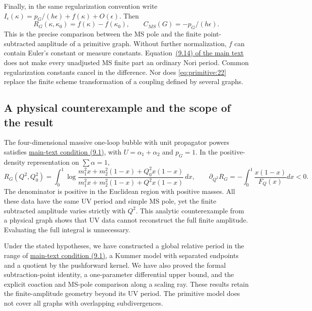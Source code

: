 \documentclass[11pt,a4paper,oneside]{article}
\theoremstyle{plain}
\theoremstyle{definition}
\theoremstyle{remark}
\numberwithin{equation}{section}
\newcommand{\otherref}[2]{\href{#1.pdf}{#2}}
\begin{document}
Finally, in the same regularization convention write \(I_\epsilon(\kappa)=p_G/(h\epsilon)+f(\kappa)+O(\epsilon)\). Then
\begin{equation}
R_G(\kappa,\kappa_0)=f(\kappa)-f(\kappa_0),\qquad
                 C_{MS}(G)=-p_G/(h\epsilon).                    \label{eq:primitive:22}
\end{equation}
This is the precise comparison between the MS pole and the finite point-subtracted amplitude of a primitive graph. Without further normalization, $f$ can contain Euler's constant or measure constants. Equation~\otherref{feynman_periods_long_paper_en}{(9.14) of the main text} does not make every unadjusted MS finite part an ordinary Nori period. Common regularization constants cancel in the difference. Nor does \eqref{eq:primitive:22} replace the finite scheme transformation of a coupling defined by several graphs.

\subsection{A physical counterexample and the scope of the result}\label{sec:primitive:9}
The four-dimensional massive one-loop bubble with unit propagator powers satisfies \otherref{feynman_periods_long_paper_en}{main-text condition (9.1)}, with \(U=\alpha_1+\alpha_2\) and \(p_G=1\). In the positive-density representation on \(\sum\alpha=1\),
\begin{equation}
R_G(Q^2,Q_0^2)=\int_0^1
 \log\frac{m_1^2x+m_2^2(1-x)+Q_0^2x(1-x)}
          {m_1^2x+m_2^2(1-x)+Q^2x(1-x)}\,dx,\qquad
 \partial_{Q^2}R_G=-\int_0^1\frac{x(1-x)}{F_Q(x)}dx<0.            \label{eq:primitive:23}
\end{equation}
The denominator is positive in the Euclidean region with positive masses. All these data have the same UV period and simple MS pole, yet the finite subtracted amplitude varies strictly with $Q^2$. This analytic counterexample from a physical graph shows that UV data cannot reconstruct the full finite amplitude. Evaluating the full integral is unnecessary.

Under the stated hypotheses, we have constructed a global relative period in the range of \otherref{feynman_periods_long_paper_en}{main-text condition (9.1)}, a Kummer model with separated endpoints and a quotient by the pushforward kernel. We have also proved the formal subtraction-point identity, a one-parameter differential upper bound, and the explicit coaction and MS-pole comparison along a scaling ray. These results retain the finite-amplitude geometry beyond its UV period. The primitive model does not cover all graphs with overlapping subdivergences.
\end{document}

